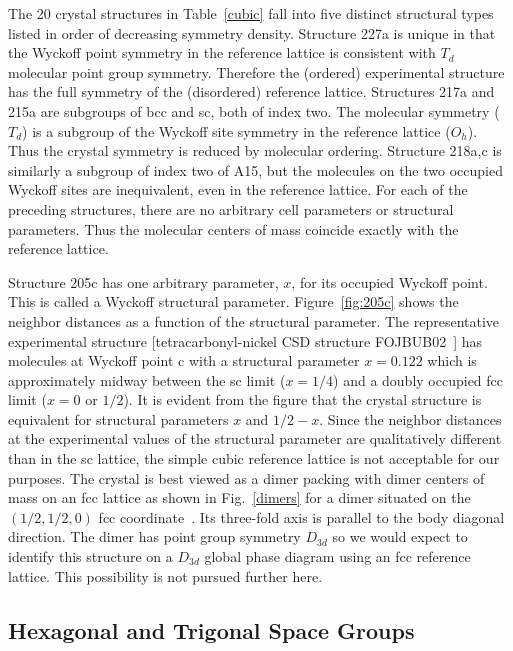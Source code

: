 \documentclass[preprint]{revtex4}              %
\begin{document}
The 20 crystal structures in Table~\ref{cubic} fall into five
distinct structural types listed in order of decreasing symmetry
density. Structure 227a is unique in that the Wyckoff point symmetry
in the reference lattice is consistent with $T_d$ molecular point
group symmetry. Therefore the (ordered) experimental structure has
the full symmetry of the (disordered) reference lattice. Structures
217a and 215a are subgroups of bcc and sc, both of index two. The
molecular symmetry ($T_d$) is a subgroup of the Wyckoff site
symmetry in the reference lattice ($O_h$). Thus the crystal symmetry
is reduced by molecular ordering. Structure 218a,c is similarly a
subgroup of index two of A15, but the molecules on the two occupied
Wyckoff sites are inequivalent, even in the reference lattice.  For
each of the preceding structures, there are no arbitrary cell
parameters or structural parameters. Thus the molecular centers of
mass coincide exactly with the reference lattice.

Structure 205c has one arbitrary parameter, $x$, for its occupied
Wyckoff point.  This is called a Wyckoff structural parameter.
Figure~\ref{fig:205c} shows the neighbor distances as a function of
the structural parameter. The representative experimental structure
[tetracarbonyl-nickel CSD structure FOJBUB02~\cite{Braga93}] has
molecules at Wyckoff point c with a structural parameter $x=0.122$
which is approximately midway between the sc limit ($x=1/4$) and a
doubly occupied fcc limit ($x=0$ or $1/2$). It is evident from the
figure that the crystal structure is equivalent for structural
parameters $x$ and $1/2-x$. Since the neighbor distances at the
experimental values of the structural parameter are qualitatively
different than in the sc lattice, the simple cubic reference lattice
is not acceptable for our purposes. The crystal is best viewed as a
dimer packing with dimer centers of mass on an fcc lattice as shown
in Fig.~\ref{dimers} for a dimer situated on the $(1/2,1/2,0)$ fcc
coordinate~\cite{mcclurg}. Its three-fold axis is parallel to the body diagonal
direction. The dimer has point group symmetry $D_{3d}$ so we would
expect to identify this structure on a $D_{3d}$ global phase diagram
using an fcc reference lattice. This possibility is not pursued
further here.

\subsection{Hexagonal and Trigonal Space Groups}
\end{document}
